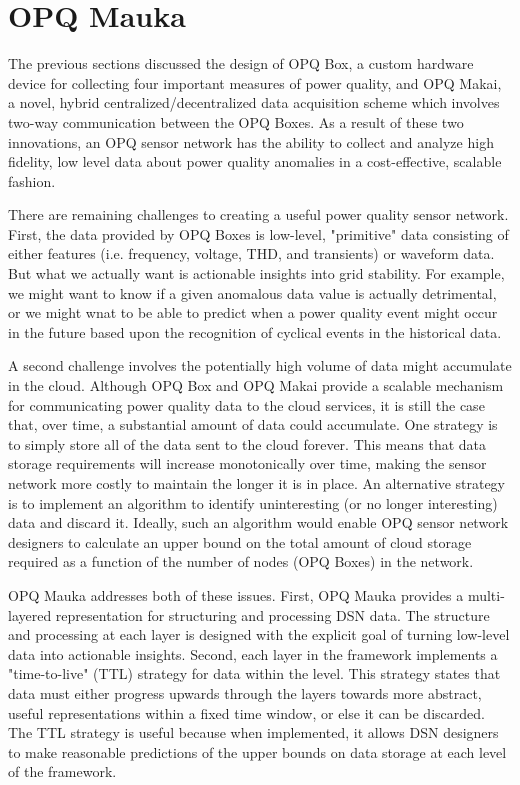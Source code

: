 \section{OPQ Mauka}
\label{sec:opq-mauka}

The previous sections discussed the design of OPQ Box, a custom hardware device for collecting four important measures of power quality, and OPQ Makai, a novel, hybrid centralized/decentralized data acquisition scheme which involves two-way communication between the OPQ Boxes.  As a result of these two innovations, an OPQ sensor network has the ability to collect and analyze high fidelity, low level data about power quality anomalies in a cost-effective, scalable fashion.

There are remaining challenges to creating a useful power quality sensor network. First, the data provided by OPQ Boxes is low-level, "primitive" data consisting of either features (i.e. frequency, voltage, THD, and transients) or waveform data. But what we actually want is actionable insights into grid stability. For example, we might want to know if a given anomalous data value is actually detrimental, or we might wnat to be able to predict when a power quality event might occur in the future based upon the recognition of cyclical events in the historical data.

A second challenge involves the potentially high volume of data might accumulate in the cloud. Although OPQ Box and OPQ Makai provide a scalable mechanism for communicating power quality data to the cloud services, it is still the case that, over time, a substantial amount of data could accumulate. One strategy is to simply store all of the data sent to the cloud forever. This means that data storage requirements will increase monotonically over time, making the sensor network more costly to maintain the longer it is in place. An alternative strategy is to implement an algorithm to identify uninteresting (or no longer interesting) data and discard it.  Ideally, such an algorithm would enable OPQ sensor network designers to calculate an upper bound on the total amount of cloud storage required as a function of the number of nodes (OPQ Boxes) in the network.

OPQ Mauka addresses both of these issues. First, OPQ Mauka provides a multi-layered representation for structuring and processing DSN data. The structure and processing at each layer is designed with the explicit goal of turning low-level data into actionable insights. Second, each layer in the framework implements a "time-to-live" (TTL) strategy for data within the level. This strategy states that data must either progress upwards through the layers towards more abstract, useful representations within a fixed time window, or else it can be discarded. The TTL strategy is useful because when implemented, it allows DSN designers to make reasonable predictions of the upper bounds on data storage at each level of the framework.

